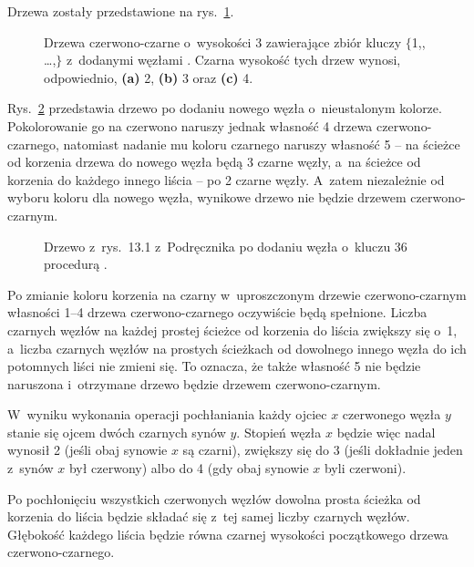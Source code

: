 
\exercise %
Drzewa zostały przedstawione na rys.\ \ref{fig:13.1-1}.
\begin{figure}[ht]
	\centering 
	\caption{Drzewa czerwono-czarne o~wysokości 3 zawierające zbiór kluczy $\{$1,,\! \dots,$\}$ z~dodanymi węzłami .
	Czarna wysokość tych drzew wynosi, odpowiednio, {\sffamily\bfseries(a)} 2, {\sffamily\bfseries(b)} 3 oraz {\sffamily\bfseries(c)} 4.} \label{fig:13.1-1}
\end{figure}

\exercise %
Rys.\ \ref{fig:13.1-2} przedstawia drzewo po dodaniu nowego węzła o~nieustalonym kolorze.
Pokolorowanie go na czerwono naruszy jednak własność 4 drzewa czerwono-czarnego, natomiast nadanie mu koloru czarnego naruszy własność 5 -- na ścieżce od korzenia drzewa do nowego węzła będą 3 czarne węzły, a~na ścieżce od korzenia do każdego innego liścia -- po 2 czarne węzły.
A~zatem niezależnie od wyboru koloru dla nowego węzła, wynikowe drzewo nie będzie drzewem czerwono-czarnym.
\begin{figure}[ht]
	\centering 
	\caption{Drzewo z~rys.\ 13.1 z~Podręcznika po dodaniu węzła o~kluczu 36 procedurą .} \label{fig:13.1-2}
\end{figure}

\exercise %
Po zmianie koloru korzenia na czarny w~uproszczonym drzewie czerwono-czarnym własności 1--4 drzewa czerwono-czarnego oczywiście będą spełnione.
Liczba czarnych węzłów na każdej prostej ścieżce od korzenia do liścia zwiększy się o~1, a~liczba czarnych węzłów na prostych ścieżkach od dowolnego innego węzła do ich potomnych liści nie zmieni się.
To oznacza, że także własność 5 nie będzie naruszona i~otrzymane drzewo będzie drzewem czerwono-czarnym.

\exercise %
W~wyniku wykonania operacji pochłaniania każdy ojciec $x$ czerwonego węzła $y$ stanie się ojcem dwóch czarnych synów $y$.
Stopień węzła $x$ będzie więc nadal wynosił 2 (jeśli obaj synowie $x$ są czarni), zwiększy się do 3 (jeśli dokładnie jeden z~synów $x$ był czerwony) albo do 4 (gdy obaj synowie $x$ byli czerwoni).

Po pochłonięciu wszystkich czerwonych węzłów dowolna prosta ścieżka od korzenia do liścia będzie składać się z~tej samej liczby czarnych węzłów.
Głębokość każdego liścia będzie równa czarnej wysokości początkowego drzewa czerwono-czarnego.

